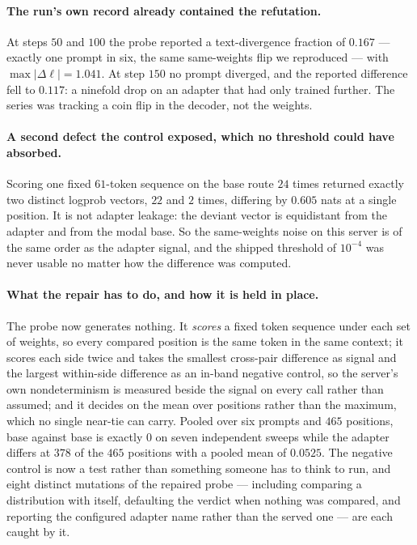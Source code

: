 \paragraph{The run's own record already contained the refutation.} At steps $50$ and $100$ the
probe reported a text-divergence fraction of $0.167$ --- exactly one prompt in six, the same
same-weights flip we reproduced --- with $\max|\Delta\ell| = 1.041$. At step $150$ no prompt
diverged, and the reported difference fell to $0.117$: a ninefold drop on an adapter that had
only trained further. The series was tracking a coin flip in the decoder, not the weights.

\paragraph{A second defect the control exposed, which no threshold could have absorbed.}
Scoring one fixed $61$-token sequence on the base route $24$ times returned exactly two
distinct logprob vectors, $22$ and $2$ times, differing by $0.605$ nats at a single position.
It is not adapter leakage: the deviant vector is equidistant from the adapter and from the
modal base. So the same-weights noise on this server is of the same order as the adapter
signal, and the shipped threshold of $10^{-4}$ was never usable no matter how the difference
was computed.

\paragraph{What the repair has to do, and how it is held in place.} The probe now generates
nothing. It \emph{scores} a fixed token sequence under each set of weights, so every compared
position is the same token in the same context; it scores each side twice and takes the
smallest cross-pair difference as signal and the largest within-side difference as an in-band
negative control, so the server's own nondeterminism is measured beside the signal on every
call rather than assumed; and it decides on the mean over positions rather than the maximum,
which no single near-tie can carry. Pooled over six prompts and $465$ positions, base against
base is exactly $0$ on seven independent sweeps while the adapter differs at $378$ of the $465$
positions with a pooled mean of $0.0525$. The negative control is now a test rather than
something someone has to think to run, and eight distinct mutations of the repaired probe ---
including comparing a distribution with itself, defaulting the verdict when nothing was
compared, and reporting the configured adapter name rather than the served one --- are each
caught by it.

